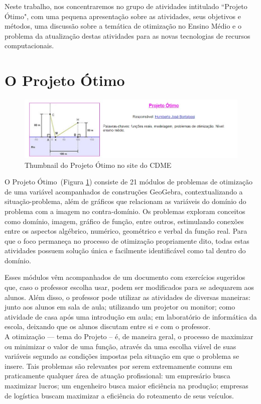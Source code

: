Neste trabalho, nos concentraremos no grupo de atividades intitulado ``Projeto Ótimo", com uma pequena apresentação sobre as atividades, seus objetivos e métodos, uma discussão sobre a temática de otimização no Ensino Médio e o problema da atualização destas atividades para as novas tecnologias de recursos computacionais. 

\section{O Projeto Ótimo}


\begin{figure}[htb!]
    \centering
    \includegraphics[width=\textwidth]{media/CDME-projeto-otimo.jpg}
    \caption{Thumbnail do Projeto Ótimo no site do CDME}
    \label{fig:projotimo}
\end{figure}

O Projeto Ótimo~(Figura \ref{fig:projotimo}) consiste de 21 módulos de problemas de otimização de uma variável acompanhados de construções GeoGebra, contextualizando a situação-problema, além de gráficos que relacionam as variáveis do domínio do problema com a imagem no contra-domínio. Os problemas exploram conceitos como domínio, imagem, gráfico de função, entre outros, estimulando conexões entre os aspectos algébrico, numérico, geométrico e verbal da função real. Para que o foco permaneça no processo de otimização propriamente dito, todas estas atividades possuem solução única e facilmente identificável como tal dentro do domínio.

Esses módulos vêm acompanhados de um documento com exercícios sugeridos que, caso o professor escolha usar, podem ser modificados para se adequarem aos alunos. Além disso, o professor pode utilizar as atividades de diversas maneiras: junto aos alunos em sala de aula; utilizando um projetor ou monitor; como atividade de casa após uma introdução em aula; em laboratório de informática da escola, deixando que os alunos discutam entre si e com o professor.
\\

A otimização --- tema do Projeto -- é, de maneira geral, o processo de maximizar ou minimizar o valor de uma função, através da uma escolha viável de suas variáveis segundo as condições impostas pela situação em que o problema se insere. Tais problemas são relevantes por serem extremamente comuns em praticamente qualquer área de atuação profissional: um empresário busca maximizar lucros; um engenheiro busca maior eficiência na produção; empresas de logística buscam maximizar a eficiência do roteamento de seus veículos. 
\\

